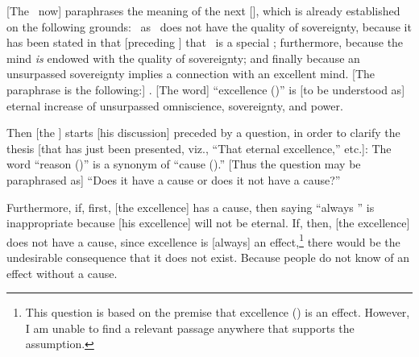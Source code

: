 [The \Bhasyakara\ now]%
 paraphrases the meaning of the next [\sutra], which is already established on the following grounds: \Isvara\ as \purusa\ does not have the quality of sovereignty, because it has been stated in that [preceding \sutra] that \Isvara\ is a special \purusa; furthermore, because the mind \emph{is} endowed with the quality of sovereignty; and finally because an unsurpassed sovereignty implies a connection with an excellent mind. [The paraphrase is the following:] .  [The word] ``excellence (\utkarsa)'' is [to be understood as] eternal increase of unsurpassed omniscience, sovereignty, and power.

Then %
 [the \Bhasyakara] starts [his discussion] preceded by a question, in order to clarify the thesis [that has just been presented, viz., ``That eternal excellence,'' etc.]:   The word ``reason (\nimitta)'' is a synonym of ``cause (\kaarana).''  [Thus the question may be paraphrased as] ``Does it have a cause or does it not have a cause?''

Furthermore, %
if, first, [the excellence] has a cause, then saying ``always \Isvara'' is inappropriate because [his excellence] will not be eternal.  If, then, [the excellence] does not have a cause, since  excellence is [always] an effect,\footnote{This question is based on the premise that excellence (\utkarsa) is an effect.  However, I am unable to find a relevant passage anywhere that supports the assumption.} there would be the undesirable consequence that it does not exist.  Because people do not know of an effect without a cause.

